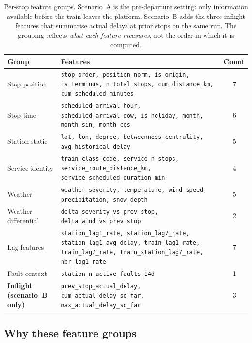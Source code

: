 \begin{table}[H]
    \centering
    \caption{Per-stop feature groups. Scenario~A is the pre-departure setting: only information available before the train leaves the platform. Scenario~B adds the three inflight features that summarise actual delays at prior stops on the same run. The grouping reflects \emph{what each feature measures}, not the order in which it is computed.}
    \label{tab:feature-groups}
    \small
    \setlength{\tabcolsep}{6pt}
    \begin{tabularx}{\textwidth}{l X S[table-format=2.0]}
        \toprule
        Group & Features & {Count} \\
        \midrule
        Stop position        & \texttt{stop\_order, position\_norm, is\_origin, is\_terminus, n\_total\_stops, cum\_distance\_km, cum\_scheduled\_minutes} & 7 \\
        Stop time            & \texttt{scheduled\_arrival\_hour, scheduled\_arrival\_dow, is\_holiday, month, month\_sin, month\_cos} & 6 \\
        Station static       & \texttt{lat, lon, degree, betweenness\_centrality, avg\_historical\_delay} & 5 \\
        Service identity     & \texttt{train\_class\_code, service\_n\_stops, service\_route\_distance\_km, service\_scheduled\_duration\_min} & 4 \\
        Weather              & \texttt{weather\_severity, temperature, wind\_speed, precipitation, snow\_depth} & 5 \\
        Weather differential & \texttt{delta\_severity\_vs\_prev\_stop, delta\_wind\_vs\_prev\_stop} & 2 \\
        Lag features         & \texttt{station\_lag1\_rate, station\_lag7\_rate, station\_lag1\_avg\_delay, train\_lag1\_rate, train\_lag7\_rate, train\_station\_lag7\_rate, nbr\_lag1\_rate} & 7 \\
        Fault context        & \texttt{station\_n\_active\_faults\_14d} & 1 \\
        \midrule
        \textbf{Inflight (scenario~B only)} & \texttt{prev\_stop\_actual\_delay, cum\_actual\_delay\_so\_far, max\_actual\_delay\_so\_far} & 3 \\
        \bottomrule
    \end{tabularx}
\end{table}

\subsection{Why these feature groups}
\label{sec:feature-rationale}

